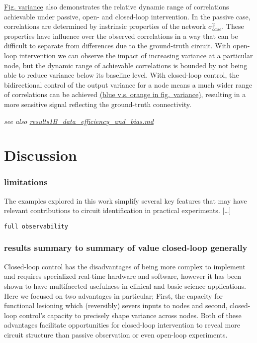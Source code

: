 \protect\hyperlink{fig-var}{Fig. variance} also demonstrates the
relative dynamic range of correlations achievable under passive, open-
and closed-loop intervention. In the passive case, correlations are
determined by instrinsic properties of the network \(\sigma^2_{base}\).
These properties have influence over the observed correlations in a way
that can be difficult to separate from differences due to the
ground-truth circuit. With open-loop intervention we can observe the
impact of increasing variance at a particular node, but the dynamic
range of achievable correlations is bounded by not being able to reduce
variance below its baseline level. With closed-loop control, the
bidirectional control of the output variance for a node means a much
wider range of correlations can be achieved
\protect\hyperlink{fig-var}{(blue v.s. orange in fig.~variance)},
resulting in a more sensitive signal reflecting the ground-truth
connectivity.

\emph{see also \url{results1B_data_efficiency_and_bias.md}}

\hypertarget{discussion}{%
\section{Discussion}\label{discussion}}

\hypertarget{limitations}{%
\subsubsection{limitations}\label{limitations}}

The examples explored in this work simplify several key features that
may have relevant contributions to circuit identification in practical
experiments. {[}\ldots{]}

\texttt{full\ observability}

\hypertarget{results-summary-to-summary-of-value-closed-loop-generally}{%
\subsubsection{results summary to summary of value closed-loop
generally}\label{results-summary-to-summary-of-value-closed-loop-generally}}

Closed-loop control has the disadvantages of being more complex to
implement and requires specialized real-time hardware and software,
however it has been shown to have multifaceted usefulness in clinical
and basic science applications. Here we focused on two advantages in
particular; First, the capacity for functional lesioning which
(reversibly) severs inputs to nodes and second, closed-loop control's
capacity to precisely shape variance across nodes. Both of these
advantages facilitate opportunities for closed-loop intervention to
reveal more circuit structure than passive observation or even open-loop
experiments.

